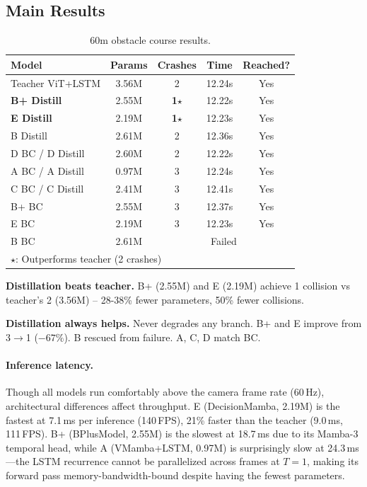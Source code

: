 \documentclass{article}
\begin{document}
\subsection{Main Results}
\label{sec:results}

\begin{table}[t]
\centering
\caption{60m obstacle course results.}
\label{tab:results}
\begin{tabular}{lcccc}
\toprule
Model & Params & Crashes & Time & Reached? \\
\midrule
Teacher ViT+LSTM & 3.56M & 2 & 12.24s & Yes \\
\midrule
\textbf{B+ Distill} & 2.55M & \textbf{1}$\star$ & 12.22s & Yes \\
\textbf{E Distill} & 2.19M & \textbf{1}$\star$ & 12.23s & Yes \\
B Distill & 2.61M & 2 & 12.36s & Yes \\
D BC / D Distill & 2.60M & 2 & 12.22s & Yes \\
A BC / A Distill & 0.97M & 3 & 12.24s & Yes \\
C BC / C Distill & 2.41M & 3 & 12.41s & Yes \\
B+ BC & 2.55M & 3 & 12.37s & Yes \\
E BC & 2.19M & 3 & 12.23s & Yes \\
B BC & 2.61M & \multicolumn{3}{c}{Failed} \\
\bottomrule
\multicolumn{5}{l}{$\star$: Outperforms teacher (2 crashes)} \\
\end{tabular}
\end{table}

\textbf{Distillation beats teacher.} B+ (2.55M) and E (2.19M) achieve 1 collision vs teacher's 2 (3.56M) -- 28-38\% fewer parameters, 50\% fewer collisions.

\textbf{Distillation always helps.} Never degrades any branch. B+ and E improve from 3$\rightarrow$1 ($-67\%$). B rescued from failure. A, C, D match BC.

\paragraph{Inference latency.}
Though all models run comfortably above the camera frame rate (60\,Hz), architectural differences affect throughput. E (DecisionMamba, 2.19M) is the fastest at 7.1\,ms per inference (140\,FPS), 21\% faster than the teacher (9.0\,ms, 111\,FPS). B+ (BPlusModel, 2.55M) is the slowest at 18.7\,ms due to its Mamba-3 temporal head, while A (VMamba+LSTM, 0.97M) is surprisingly slow at 24.3\,ms---the LSTM recurrence cannot be parallelized across frames at $T=1$, making its forward pass memory-bandwidth-bound despite having the fewest parameters.
\end{document}
